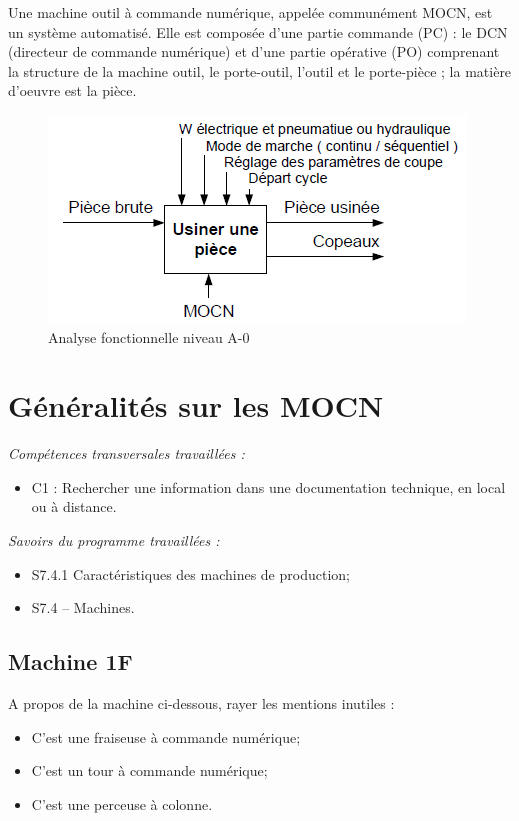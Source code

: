 \documentclass[12pt]{article}
\newcounter{exo}
\newenvironment{exo}{\stepcounter{exo}\vspace{0.5cm}{\bfseries Question \theexo\ :}}{\par\vspace{0.5cm}}
\begin{document}
Une machine outil à commande numérique, appelée communément MOCN, est un système
automatisé. Elle est composée d’une partie commande (PC) : le DCN (directeur de commande
numérique) et d’une partie opérative (PO) comprenant la structure de la machine outil, le porte-outil, l’outil et le porte-pièce ; la matière d’oeuvre est la pièce.
\begin{figure}
\centering
\includegraphics[width=0.7\linewidth]{A0.PNG}
\caption{Analyse fonctionnelle niveau A-0}
\label{A0}
\end{figure}

\newpage

\section{Généralités sur les MOCN}

\begin{minipage}{.55\linewidth}
\textit{Compétences transversales travaillées :}
\begin{itemize}
    \item C1 : Rechercher une information dans une documentation technique, en local ou à distance.
\end{itemize}

\end{minipage}
\begin{minipage}{.44\linewidth}
\textit{Savoirs du programme travaillées :}
\begin{itemize}
    \item S7.4.1 Caractéristiques des machines de production;
    \item S7.4 – Machines.
\end{itemize}
\end{minipage}


\subsection{Machine 1F}

\begin{exo}\label{exo1} A propos de la machine ci-dessous, rayer les mentions inutiles :
\begin{itemize}
    \item C'est une fraiseuse à commande numérique;
    \item C'est un tour à commande numérique;
    \item C'est une perceuse à colonne.
\end{itemize}
\end{exo}
\end{document}
